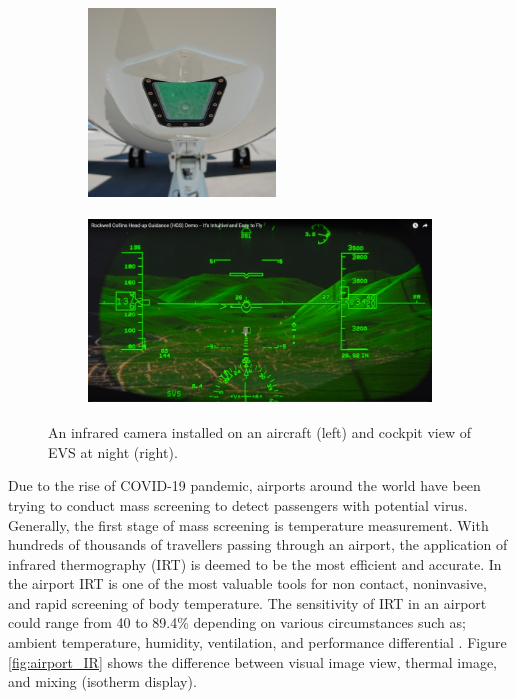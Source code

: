 \begin{figure}[!ht]
\begin{center}
%    
  \begin{subfigure}[b]{0.3\textwidth}
    \includegraphics[height=5cm]{Figures/IR_IR camera install.jpg}
  \end{subfigure}
  \begin{subfigure}[b]{0.5\textwidth}
    \includegraphics[height=5cm]{Figures/IR_EVS view.png}
  \end{subfigure}
%  
  \caption{An infrared camera installed on an aircraft \cite{AnonymousEnhancedWikipedia} (left) and cockpit view of EVS at night \cite{FehrmBjornsAnalysis} (right).}
    \label{fig:EVS system}
\end{center}
\end{figure}

\noindent Due to the rise of COVID-19 pandemic, airports around the world have been trying to conduct mass screening to detect passengers with potential virus. Generally, the first stage of mass screening is temperature measurement. With hundreds of thousands of travellers passing through an airport, the application of infrared thermography (IRT) is deemed to be the most efficient and accurate. In the airport IRT is one of the most valuable tools for non contact, noninvasive, and rapid screening of body temperature.  The sensitivity of IRT in an airport could range from 40 to 89.4\% depending on various circumstances such as; ambient temperature, humidity, ventilation, and performance differential \cite{Sun2017ApplicationsStations}. Figure \ref{fig:airport_IR} shows the difference between visual image view, thermal image, and mixing (isotherm display).\\

